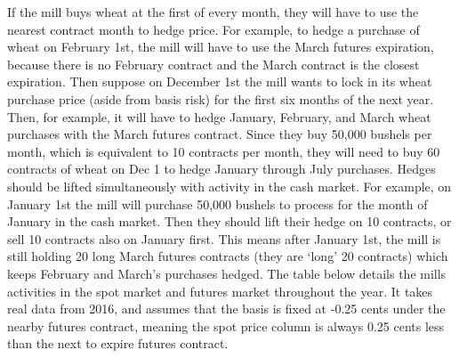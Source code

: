 \documentclass[
  letterpaper,
  DIV=11,
  numbers=noendperiod]{scrreprt}
\begin{document}
If the mill buys wheat at the first of every month, they will have to
use the nearest contract month to hedge price. For example, to hedge a
purchase of wheat on February 1st, the mill will have to use the March
futures expiration, because there is no February contract and the March
contract is the closest expiration. Then suppose on December 1st the
mill wants to lock in its wheat purchase price (aside from basis risk)
for the first six months of the next year. Then, for example, it will
have to hedge January, February, and March wheat purchases with the
March futures contract. Since they buy 50,000 bushels per month, which
is equivalent to 10 contracts per month, they will need to buy 60
contracts of wheat on Dec 1 to hedge January through July purchases.
Hedges should be lifted simultaneously with activity in the cash market.
For example, on January 1st the mill will purchase 50,000 bushels to
process for the month of January in the cash market. Then they should
lift their hedge on 10 contracts, or sell 10 contracts also on January
first. This means after January 1st, the mill is still holding 20 long
March futures contracts (they are `long' 20 contracts) which keeps
February and March's purchases hedged. The table below details the mills
activities in the spot market and futures market throughout the year. It
takes real data from 2016, and assumes that the basis is fixed at -0.25
cents under the nearby futures contract, meaning the spot price column
is always 0.25 cents less than the next to expire futures contract.
\end{document}
